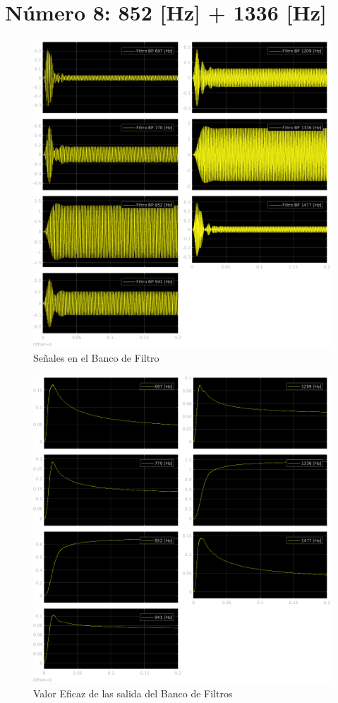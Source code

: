 \section{Número 8: 852 [Hz] + 1336 [Hz]}
\label{sec:signal_8}
\begin{figure}[H]
  \centering
  \includegraphics[width=\linewidth]{images/simulacion/fallas/bank/8.png}
  \caption{Señales en el Banco de Filtro}
  \label{fig:num_8_bank}
\end{figure}

\begin{figure}[H]
  \centering
  \includegraphics[width=\linewidth]{images/simulacion/fallas/rms/8.png}
  \caption{Valor Eficaz de las salida del Banco de Filtros }
  \label{fig:num_8_rms}
\end{figure}

